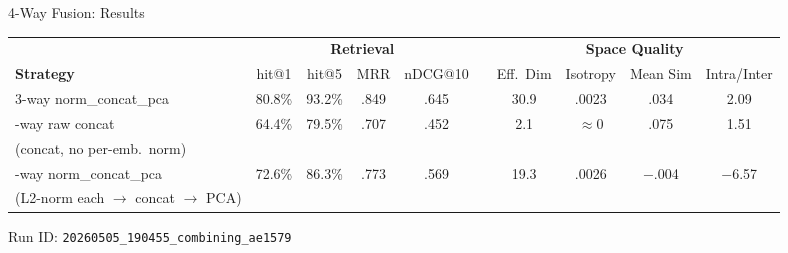\documentclass[aspectratio=169,10pt]{beamer}
\newcommand{\chit}[1]{\cellcolor{hit!30} #1}
\newcommand{\cmiss}[1]{\cellcolor{miss!25} #1}
\newcommand{\cwarn}[1]{\cellcolor{warn!30} #1}
\begin{document}
\begin{frame}{4-Way Fusion: Results}

  \centering
  \vspace{0.2em}
  {\small
  \renewcommand{\arraystretch}{1.35}
  \setlength{\tabcolsep}{3.5pt}
  \begin{tabular}{l *{4}{c} c *{4}{c}}
    \toprule
    & \multicolumn{4}{c}{\textbf{Retrieval}}
    && \multicolumn{4}{c}{\textbf{Space Quality}} \\
    \cmidrule{2-5} \cmidrule{7-10}
    \textbf{Strategy}
      & hit@1 & hit@5 & MRR & nDCG@10
      && Eff.\ Dim & Isotropy & Mean Sim & Intra/Inter \\
    \midrule
    \rowcolor{c1!12}
    3-way norm\_concat\_pca
      & \chit{80.8\%} & \chit{93.2\%} & \chit{.849} & \chit{.645}
      && \chit{30.9} & .0023 & .034 & \chit{2.09} \\
    \addlinespace[2pt]
    4-way raw concat
      & \cmiss{64.4\%} & \cmiss{79.5\%} & \cmiss{.707} & \cmiss{.452}
      && \cmiss{2.1} & \cmiss{$\approx$0} & .075 & \cmiss{1.51} \\
    {\scriptsize (concat, no per-emb.\ norm)}
      & & & & && & & & \\
    \addlinespace[2pt]
    4-way norm\_concat\_pca
      & \cwarn{72.6\%} & \cwarn{86.3\%} & \cwarn{.773} & \cwarn{.569}
      && \cwarn{19.3} & .0026 & \cmiss{$-$.004} & \cmiss{$-$6.57} \\
    {\scriptsize (L2-norm each $\to$ concat $\to$ PCA)}
      & & & & && & & & \\
    \bottomrule
  \end{tabular}}

  \vspace{0.3em}
  {\scriptsize\color{black!55}
  Run ID: \texttt{20260505\_190455\_combining\_ae1579}}

\end{frame}
\end{document}
